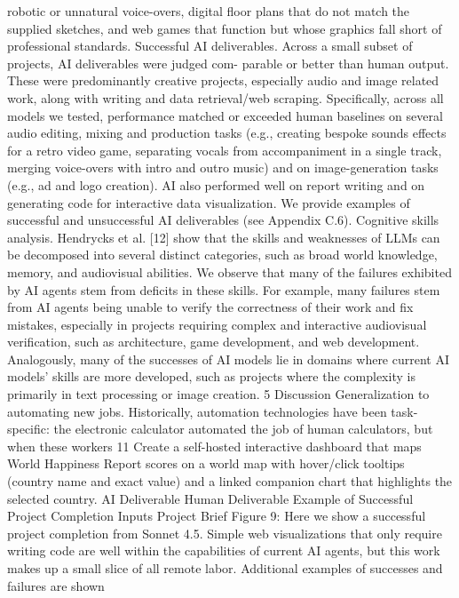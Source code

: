 robotic or unnatural voice-overs, digital floor
plans that do not match the supplied sketches,
and web games that function but whose graphics
fall short of professional standards.
Successful AI deliverables.
Across a small subset of projects, AI deliverables were judged com-
parable or better than human output. These were predominantly creative projects, especially audio
and image related work, along with writing and data retrieval/web scraping. Specifically, across
all models we tested, performance matched or exceeded human baselines on several audio editing,
mixing and production tasks (e.g., creating bespoke sounds effects for a retro video game, separating
vocals from accompaniment in a single track, merging voice-overs with intro and outro music) and
on image-generation tasks (e.g., ad and logo creation). AI also performed well on report writing
and on generating code for interactive data visualization. We provide examples of successful and
unsuccessful AI deliverables (see Appendix C.6).
Cognitive skills analysis.
Hendrycks et al. [12] show that the skills and weaknesses of LLMs
can be decomposed into several distinct categories, such as broad world knowledge, memory, and
audiovisual abilities. We observe that many of the failures exhibited by AI agents stem from deficits
in these skills. For example, many failures stem from AI agents being unable to verify the correctness
of their work and fix mistakes, especially in projects requiring complex and interactive audiovisual
verification, such as architecture, game development, and web development. Analogously, many of
the successes of AI models lie in domains where current AI models’ skills are more developed, such
as projects where the complexity is primarily in text processing or image creation.
5
Discussion
Generalization to automating new jobs.
Historically, automation technologies have been task-
specific: the electronic calculator automated the job of human calculators, but when these workers
11
Create a self-hosted interactive dashboard that maps
World Happiness Report scores on a world map with
hover/click tooltips (country name and exact value) and a
linked companion chart that highlights the selected
country.
AI Deliverable
Human Deliverable
Example of Successful Project Completion
Inputs
Project Brief
Figure 9: Here we show a successful project completion from Sonnet 4.5. Simple web visualizations
that only require writing code are well within the capabilities of current AI agents, but this work
makes up a small slice of all remote labor. Additional examples of successes and failures are shown
